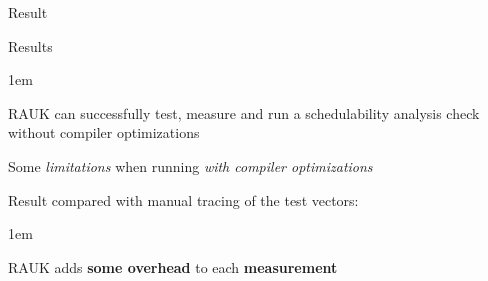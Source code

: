 \begin{frame}{Result}
    \begin{block}{Results}
        \begin{itemize-size}{1em}
            \item RAUK can successfully test, measure and
            run a schedulability analysis check without compiler optimizations
            \item Some \emph{limitations} when running \emph{with compiler
            optimizations}
        \end{itemize-size}
        \vspace{0.5em}
        Result compared with manual tracing of the test vectors:
        \begin{itemize-size}{1em}
        \vspace{0.5em}
            \item RAUK adds \textbf{some overhead} to each \textbf{measurement}
        \end{itemize-size}
    \end{block}
\end{frame}
